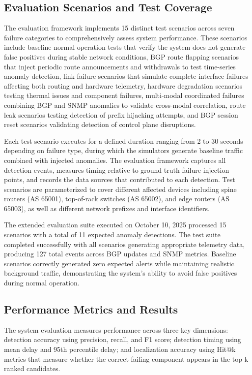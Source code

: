 \documentclass[11pt]{article}
\begin{document}
\subsection{Evaluation Scenarios and Test Coverage}

The evaluation framework implements 15 distinct test scenarios across seven failure categories to comprehensively assess system performance. These scenarios include baseline normal operation tests that verify the system does not generate false positives during stable network conditions, BGP route flapping scenarios that inject periodic route announcements and withdrawals to test time-series anomaly detection, link failure scenarios that simulate complete interface failures affecting both routing and hardware telemetry, hardware degradation scenarios testing thermal issues and component failures, multi-modal coordinated failures combining BGP and SNMP anomalies to validate cross-modal correlation, route leak scenarios testing detection of prefix hijacking attempts, and BGP session reset scenarios validating detection of control plane disruptions.

Each test scenario executes for a defined duration ranging from 2 to 30 seconds depending on failure type, during which the simulators generate baseline traffic combined with injected anomalies. The evaluation framework captures all detection events, measures timing relative to ground truth failure injection points, and records the data sources that contributed to each detection. Test scenarios are parameterized to cover different affected devices including spine routers (AS 65001), top-of-rack switches (AS 65002), and edge routers (AS 65003), as well as different network prefixes and interface identifiers.

The extended evaluation suite executed on October 10, 2025 processed 15 scenarios with a total of 11 expected anomaly detections. The test suite completed successfully with all scenarios generating appropriate telemetry data, producing 127 total events across BGP updates and SNMP metrics. Baseline scenarios correctly generated zero expected alerts while maintaining realistic background traffic, demonstrating the system's ability to avoid false positives during normal operation.

\subsection{Performance Metrics and Results}

The system evaluation measures performance across three key dimensions: detection accuracy using precision, recall, and F1 score; detection timing using mean delay and 95th percentile delay; and localization accuracy using Hit@k metrics that measure whether the correct failing component appears in the top k ranked candidates.
\end{document}
